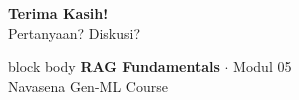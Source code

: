 \documentclass[aspectratio=169,t]{beamer}
\begin{document}
\begin{frame}[plain]
  \vspace{2cm}
  \begin{center}
    {\color{nvgreen}\Huge\bfseries Terima Kasih!}\\[1.5em]
    {\color{nvgray}\Large Pertanyaan? Diskusi?}\\[2em]
    \begin{beamercolorbox}[rounded=true,shadow=false,sep=8pt,wd=10cm]{block body}
      \centering\color{white}
      \textbf{RAG Fundamentals} \quad $\cdot$ \quad Modul 05 \\
      Navasena Gen-ML Course
    \end{beamercolorbox}
  \end{center}
\end{frame}
\end{document}
